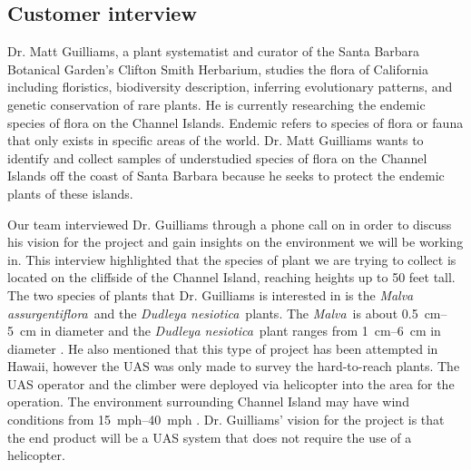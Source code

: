 \documentclass{wrcecapstone}
\newcommand{\Dudleyanesiotica}{\emph{Dudleya nesiotica}}
\newcommand{\Malvaassurgentiflora}{\emph{Malva assurgentiflora}}
\newcommand{\Malva}{\emph{Malva}}
\begin{document}
\subsection{Customer interview}
Dr. Matt Guilliams, a plant systematist and curator of the Santa Barbara Botanical Garden's Clifton Smith Herbarium, studies the flora of California including floristics, biodiversity description, inferring evolutionary patterns, and genetic conservation of rare plants. He is currently researching the endemic species of flora on the Channel Islands. Endemic refers to species of flora or fauna that only exists in specific areas of the world. Dr. Matt Guilliams wants to identify and collect samples of understudied species of flora on the Channel Islands off the coast of Santa Barbara because he seeks to protect the endemic plants of these islands.

Our team interviewed Dr. Guilliams through a phone call on  in order to discuss his vision for the project and gain insights on the environment we will be working in. This interview highlighted that the species of plant we are trying to collect is located on the cliffside of the Channel Island, reaching heights up to 50 feet tall. The two species of plants that Dr. Guilliams is interested in is the \Malvaassurgentiflora\ and the \Dudleyanesiotica\ plants. The \Malva\ is about \SIrange{0.5}{5}{\centi\meter} in diameter and the \Dudleyanesiotica\ plant ranges from \SIrange{1}{6}{\centi\meter} in diameter \cite{jeps2019dudleya, wikipedia2019malva}. He also mentioned that this type of project has been attempted in Hawaii, however the UAS was only made to survey the hard-to-reach plants.  The UAS operator and the climber were deployed via helicopter into the area for the operation. The  environment surrounding Channel Island may have wind conditions from \SIrange{15}{40}{mph} \cite{nps2019weather}.  Dr. Guilliams’ vision for the project is that the end product will be a UAS system that does not require the use of a helicopter.
\end{document}
